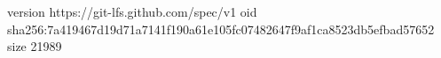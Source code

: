 version https://git-lfs.github.com/spec/v1
oid sha256:7a419467d19d71a7141f190a61e105fc07482647f9af1ca8523db5efbad57652
size 21989
